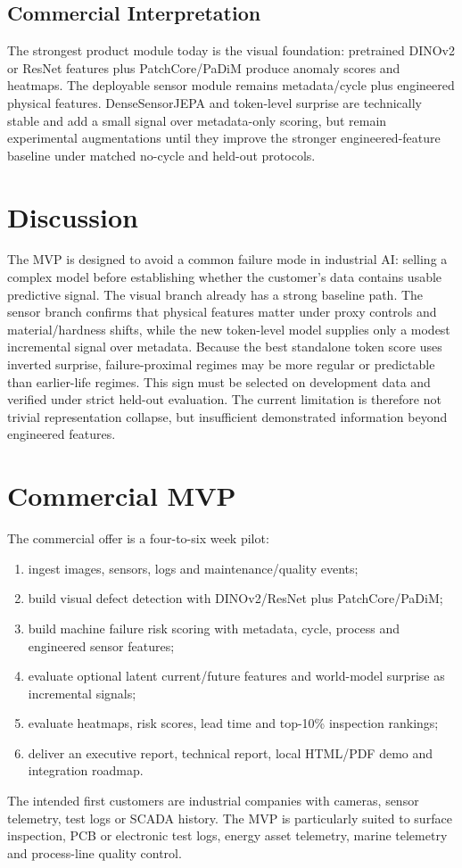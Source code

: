 \documentclass[10pt,conference]{IEEEtran}
\begin{document}
\subsection{Commercial Interpretation}
The strongest product module today is the visual foundation: pretrained DINOv2 or ResNet features plus PatchCore/PaDiM produce anomaly scores and heatmaps. The deployable sensor module remains metadata/cycle plus engineered physical features. DenseSensorJEPA and token-level surprise are technically stable and add a small signal over metadata-only scoring, but remain experimental augmentations until they improve the stronger engineered-feature baseline under matched no-cycle and held-out protocols.

\section{Discussion}
The MVP is designed to avoid a common failure mode in industrial AI: selling a complex model before establishing whether the customer's data contains usable predictive signal. The visual branch already has a strong baseline path. The sensor branch confirms that physical features matter under proxy controls and material/hardness shifts, while the new token-level model supplies only a modest incremental signal over metadata. Because the best standalone token score uses inverted surprise, failure-proximal regimes may be more regular or predictable than earlier-life regimes. This sign must be selected on development data and verified under strict held-out evaluation. The current limitation is therefore not trivial representation collapse, but insufficient demonstrated information beyond engineered features.

\section{Commercial MVP}
The commercial offer is a four-to-six week pilot:
\begin{enumerate}
  \item ingest images, sensors, logs and maintenance/quality events;
  \item build visual defect detection with DINOv2/ResNet plus PatchCore/PaDiM;
  \item build machine failure risk scoring with metadata, cycle, process and engineered sensor features;
  \item evaluate optional latent current/future features and world-model surprise as incremental signals;
  \item evaluate heatmaps, risk scores, lead time and top-10\% inspection rankings;
  \item deliver an executive report, technical report, local HTML/PDF demo and integration roadmap.
\end{enumerate}
The intended first customers are industrial companies with cameras, sensor telemetry, test logs or SCADA history. The MVP is particularly suited to surface inspection, PCB or electronic test logs, energy asset telemetry, marine telemetry and process-line quality control.
\end{document}

